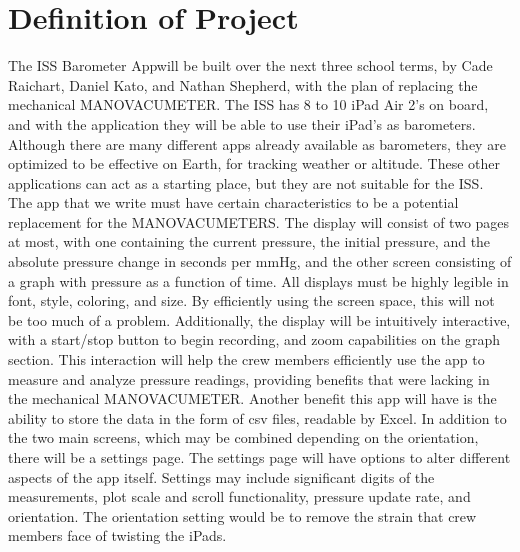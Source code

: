 \documentclass[onecolumn, draftclsnofoot,10pt, compsoc]{IEEEtran}
\def \GroupMemberOne{			Cade Raichart}
\def \GroupMemberTwo{			Daniel Kato}
\def \GroupMemberThree{			Nathan Shepherd}
\def \CapstoneProjectName{		ISS Barometer App}
\begin{document}
\section{Definition of Project}
The \CapstoneProjectName will be built over the next three school terms, by \GroupMemberOne, \GroupMemberTwo, and \GroupMemberThree, with the plan of replacing the mechanical MANOVACUMETER.
The ISS has 8 to 10 iPad Air 2's on board, and with the application they will be able to use their iPad's as barometers.
Although there are many different apps already available as barometers, they are optimized to be effective on Earth, for tracking weather or altitude.
These other applications can act as a starting place, but they are not suitable for the ISS.
The app that we write must have certain characteristics to be a potential replacement for the MANOVACUMETERS.
The display will consist of two pages at most, with one containing the current pressure, the initial pressure, and the absolute pressure change in seconds per mmHg, and the other screen consisting of a graph with pressure as a function of time.
All displays must be highly legible in font, style, coloring, and size.
By efficiently using the screen space, this will not be too much of a problem.
Additionally, the display will be intuitively interactive, with a start/stop button to begin recording, and zoom capabilities on the graph section.
This interaction will help the crew members efficiently use the app to measure and analyze pressure readings, providing benefits that were lacking in the mechanical MANOVACUMETER.
Another benefit this app will have is the ability to store the data in the form of csv files, readable by Excel.
In addition to the two main screens, which may be combined depending on the orientation, there will be a settings page.
The settings page will have options to alter different aspects of the app itself.
Settings may include significant digits of the measurements, plot scale and scroll functionality, pressure update rate, and orientation.
The orientation setting would be to remove the strain that crew members face of twisting the iPads. 
\end{document}
